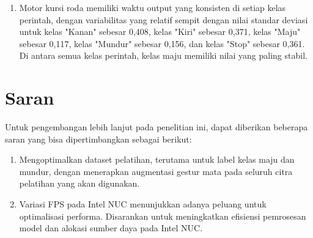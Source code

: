 \begin{enumerate}[nolistsep]
  \item Motor kursi roda memiliki waktu output yang konsisten di setiap kelas perintah, dengan variabilitas yang relatif sempit dengan nilai standar deviasi untuk kelas "Kanan" sebesar 0,408, kelas "Kiri" sebesar 0,371, kelas "Maju" sebesar 0,117, kelas "Mundur" sebesar 0,156, dan kelas "Stop" sebesar 0,361. Di antara semua kelas perintah, kelas maju memiliki nilai yang paling stabil.

\end{enumerate}

\section{Saran}
\label{chap:saran}

Untuk pengembangan lebih lanjut pada penelitian ini, dapat diberikan beberapa saran yang bisa dipertimbangkan sebagai berikut:

\begin{enumerate}[nolistsep]

  \item Mengoptimalkan dataset pelatihan, terutama untuk label kelas maju dan mundur, dengan menerapkan augmentasi gestur mata pada seluruh citra pelatihan yang akan digunakan.
  
  \item Variasi FPS pada Intel NUC menunjukkan adanya peluang untuk optimalisasi performa. Disarankan untuk meningkatkan efisiensi pemrosesan model dan alokasi sumber daya pada Intel NUC.

\end{enumerate}
